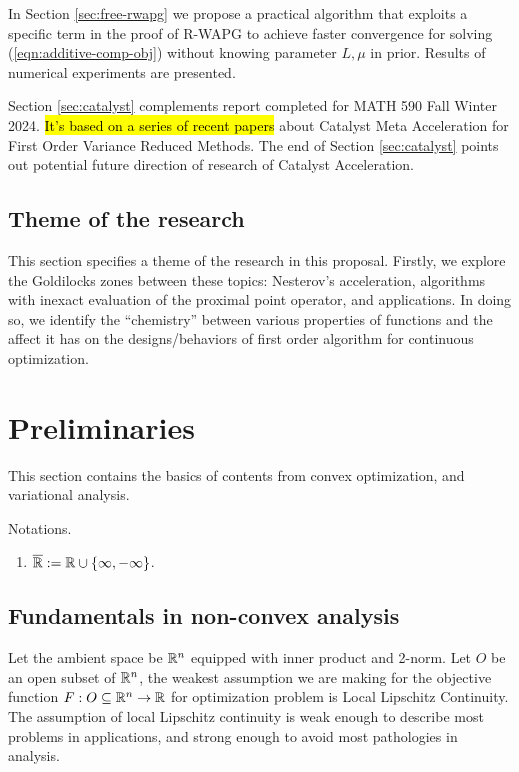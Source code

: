\documentclass[12pt]{article}
\begin{document}
    \par
    In Section \ref{sec:free-rwapg} we propose a practical algorithm that exploits a specific term in the proof of R-WAPG to achieve faster convergence for solving (\ref{eqn:additive-comp-obj}) without knowing parameter $L, \mu$ in prior. 
    Results of numerical experiments are presented. 
    \par
    Section \ref{sec:catalyst} complements report completed for MATH 590 Fall Winter 2024. 
    {\hl{It's based on a series of recent papers}} \cite{lin_universal_2015,lin_catalyst_2018,paquette_catalyst_2018} about Catalyst Meta Acceleration for First Order Variance Reduced Methods. 
    The end of Section \ref{sec:catalyst} points out potential future direction of research of Catalyst Acceleration. 
    \subsection{Theme of the research}
        This section specifies a theme of the research in this proposal. 
        Firstly, we explore the Goldilocks zones between these topics: Nesterov's acceleration, algorithms with inexact evaluation of the proximal point operator, and applications.  
        In doing so, we identify the ``chemistry'' between various properties of functions and the affect it has on the designs/behaviors of first order algorithm for continuous optimization. 


    
\section{Preliminaries}
    This section contains the basics of contents from convex optimization, and variational analysis. 
    \par
    Notations. 
    \begin{enumerate}
        \item $\overline {\mathbb R} := \mathbb R \cup \{\infty, -\infty\}$. 
    \end{enumerate}
    \subsection{Fundamentals in non-convex analysis}
        Let the ambient space be $\mathbb R^n$ equipped with inner product and 2-norm. 
        Let $O$ be an open subset of $\mathbb R^n$, the weakest assumption we are making for the objective function $F: O \subseteq \mathbb R^n \rightarrow \mathbb R$ for optimization problem is Local Lipschitz Continuity. 
        The assumption of local Lipschitz continuity is weak enough to describe most problems in applications, and strong enough to avoid most pathologies in analysis. 
\end{document}
